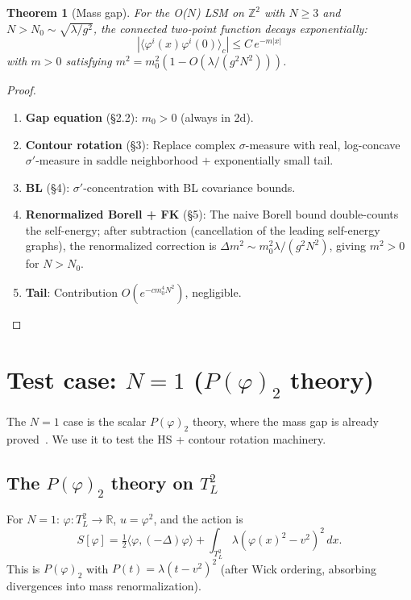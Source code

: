 \documentclass[12pt]{article}
\newtheorem{theorem}{Theorem}
\theoremstyle{definition}
\theoremstyle{remark}
\newcommand{\R}{\mathbb{R}}
\newcommand{\Z}{\mathbb{Z}}
\newcommand{\ph}{\varphi}
\begin{document}
\begin{theorem}[Mass gap]
\label{thm:main}
For the O($N$) LSM on $\Z^2$ with $N \ge 3$ and
$N > N_0 \sim \sqrt{\lambda/g^2}$, the connected two-point function
decays exponentially:
\begin{equation}
  |\langle\ph^i(x)\ph^i(0)\rangle_c| \le C\,e^{-m|x|}
\end{equation}
with $m > 0$ satisfying
$m^2 = m_0^2(1 - O(\lambda/(g^2 N^2)))$.
\end{theorem}

\begin{proof}
\begin{enumerate}
\item \textbf{Gap equation} (\S2.2): $m_0 > 0$ (always in 2d).
\item \textbf{Contour rotation} (\S3): Replace complex $\sigma$-measure
  with real, log-concave $\sigma'$-measure in saddle neighborhood
  $+$ exponentially small tail.
\item \textbf{BL} (\S4): $\sigma'$-concentration with BL
  covariance bounds.
\item \textbf{Renormalized Borell + FK} (\S5): The naive Borell
  bound double-counts the self-energy; after subtraction (cancellation
  of the leading self-energy graphs), the renormalized correction is
  $\Delta m^2 \sim m_0^2\lambda/(g^2N^2)$, giving $m^2 > 0$ for
  $N > N_0$.
\item \textbf{Tail}: Contribution $O(e^{-cm_0^4N^2})$, negligible.
  \qedhere
\end{enumerate}
\end{proof}

\section{Test case: $N = 1$ ($P(\ph)_2$ theory)}

The $N=1$ case is the scalar $P(\ph)_2$ theory, where the mass
gap is already proved~\cite{GJS74}. We use it to test the HS +
contour rotation machinery.

\subsection{The $P(\ph)_2$ theory on $T^2_L$}

For $N=1$: $\ph : T^2_L \to \R$, $u = \ph^2$, and the action is
\begin{equation}
  S[\ph] = \tfrac{1}{2}\langle\ph,(-\Delta)\ph\rangle
    + \int_{T^2_L}\lambda(\ph(x)^2-v^2)^2\,dx.
\end{equation}
This is $P(\ph)_2$ with $P(t) = \lambda(t - v^2)^2$ (after Wick
ordering, absorbing divergences into mass renormalization).
\end{document}
